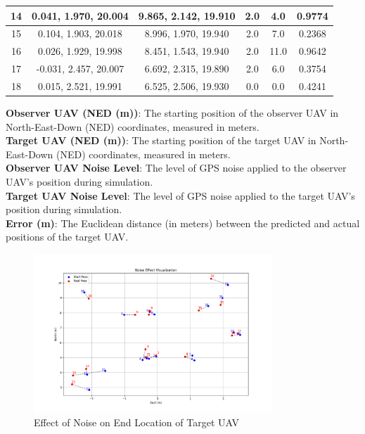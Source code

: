 \begin{table}[h!]
{\begin{tabular}{|c|c|c|c|c|c|}
14 & 0.041, 1.970, 20.004 & 9.865, 2.142, 19.910 & 2.0 & 4.0 & 0.9774 \\ \hline
15 & 0.104, 1.903, 20.018 & 8.996, 1.970, 19.940 & 2.0 & 7.0 & 0.2368 \\ \hline
16 & 0.026, 1.929, 19.998 & 8.451, 1.543, 19.940 & 2.0 & 11.0 & 0.9642 \\ \hline
17 & -0.031, 2.457, 20.007 & 6.692, 2.315, 19.890 & 2.0 & 6.0 & 0.3754 \\ \hline
18 & 0.015, 2.521, 19.991 & 6.525, 2.506, 19.930 & 0.0 & 0.0 & 0.4241 \\ \hline
\end{tabular}%

}
\small
\textbf{Observer UAV (NED (m))}: The starting position of the observer UAV in North-East-Down (NED) coordinates, measured in meters. \\
\textbf{Target UAV (NED (m))}: The starting position of the target UAV in North-East-Down (NED) coordinates, measured in meters. \\
\textbf{Observer UAV Noise Level}: The level of GPS noise applied to the observer UAV's position during simulation. \\
\textbf{Target UAV Noise Level}: The level of GPS noise applied to the target UAV's position during simulation. \\
\textbf{Error (m)}: The Euclidean distance (in meters) between the predicted and actual positions of the target UAV.

\end{table}


\begin{figure}[h!]
    \centering
    \includegraphics[width=0.8\textwidth]{Imgs/noise_effect.png} %
    \caption{Effect of Noise on End Location of Target UAV}
\label{fig:noise_effect_target_UAV}
\end{figure}

